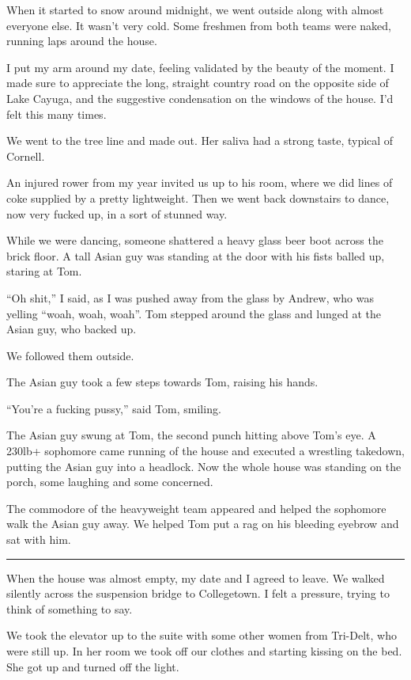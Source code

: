 When it started to snow around midnight, we went outside along with almost
everyone else.  It wasn't very cold.  Some freshmen from both teams were naked,
running laps around the house.

I put my arm around my date, feeling validated by the beauty of the moment.   I
made sure to appreciate the long, straight country road on the opposite side of
Lake Cayuga, and the suggestive condensation on the windows of the house.  I'd
felt this many times. 

We went to the tree line and made out.  Her saliva had a strong taste, typical
of Cornell.

An injured rower from my year invited us up to his room, where we did lines of
coke supplied by a pretty lightweight.  Then we went back downstairs to dance,
now very fucked up, in a sort of stunned way.  

While we were dancing, someone shattered a heavy glass beer boot across the
brick floor.  A tall Asian guy was standing at the door with his fists balled
up, staring at Tom.

``Oh shit,'' I said, as I was pushed away from the glass by Andrew, who was
yelling ``woah, woah, woah''.  Tom stepped around the glass and lunged at the
Asian guy, who backed up.

We followed them outside.

The Asian guy took a few steps towards Tom, raising his hands.  

``You're a fucking pussy,'' said Tom, smiling. 

The Asian guy swung at Tom, the second punch hitting above Tom's eye.  A 230lb+
sophomore came running of the house and executed a wrestling takedown, putting
the Asian guy into a headlock.   Now the whole house was standing on the porch,
some laughing and some concerned.

The commodore of the heavyweight team appeared and helped the sophomore walk the
Asian guy away.  We helped Tom put a rag on his bleeding eyebrow and sat with
him.  

\plainfancybreak{12pt}{2}{* * *}

When the house was almost empty, my date and I agreed to leave.  We walked
silently across the suspension bridge to Collegetown.  I felt a pressure, trying
to think of something to say.

We took the elevator up to the suite with some other women from Tri-Delt, who
were still up.  In her room we took off our clothes and starting kissing on the
bed.  She got up and turned off the light.

